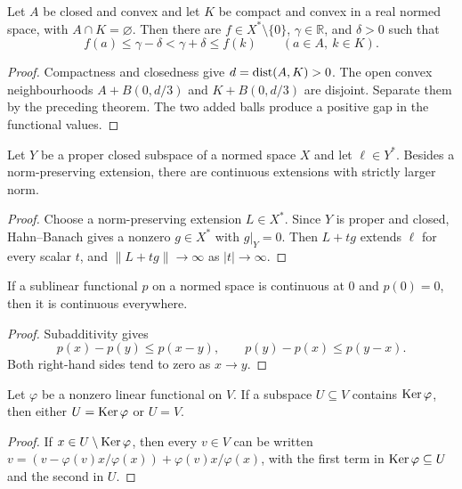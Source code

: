 \begin{notetheorem}
Let $A$ be closed and convex and let $K$ be compact and convex in a real
normed space, with $A\cap K=\varnothing$.  Then there are
$f\in X^*\setminus\{0\}$, $\gamma\in\mathbb R$, and $\delta>0$ such that
\[
  f(a)\le\gamma-\delta<\gamma+\delta\le f(k)
  \qquad(a\in A,\ k\in K).
\]
\end{notetheorem}

\begin{proof}
Compactness and closedness give $d=\operatorname{dist}(A,K)>0$.  The open convex
neighbourhoods $A+B(0,d/3)$ and $K+B(0,d/3)$ are disjoint.  Separate them by
the preceding theorem.  The two added balls produce a positive gap in the
functional values.
\end{proof}

\begin{notetheorem}
Let $Y$ be a proper closed subspace of a normed space $X$ and let
$\ell\in Y^*$.  Besides a norm-preserving extension, there are continuous
extensions with strictly larger norm.
\end{notetheorem}

\begin{proof}
Choose a norm-preserving extension $L\in X^*$.  Since $Y$ is proper and
closed, Hahn--Banach gives a nonzero $g\in X^*$ with $g|_Y=0$.  Then
$L+tg$ extends $\ell$ for every scalar $t$, and
$\|L+tg\|\to\infty$ as $|t|\to\infty$.
\end{proof}

\begin{noteexercise}
If a sublinear functional $p$ on a normed space is continuous at $0$ and
$p(0)=0$, then it is continuous everywhere.
\end{noteexercise}

\begin{proof}
Subadditivity gives
\[
  p(x)-p(y)\le p(x-y),
  \qquad
  p(y)-p(x)\le p(y-x).
\]
Both right-hand sides tend to zero as $x\to y$.
\end{proof}

\begin{noteexercise}
Let $\varphi$ be a nonzero linear functional on $V$.  If a subspace
$U\subseteq V$ contains $\operatorname{Ker}\varphi$, then either $U=\operatorname{Ker}\varphi$ or
$U=V$.
\end{noteexercise}

\begin{proof}
If $x\in U\setminus\operatorname{Ker}\varphi$, then every $v\in V$ can be written
$v=(v-\varphi(v)x/\varphi(x))+\varphi(v)x/\varphi(x)$, with the first term
in $\operatorname{Ker}\varphi\subseteq U$ and the second in $U$.
\end{proof}

